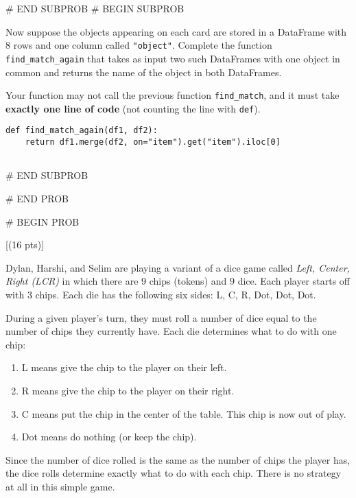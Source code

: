 \documentclass[twoside,12pt]{article}
\begin{document}
{        
    

# END SUBPROB
    # BEGIN SUBPROB


        Now suppose the objects appearing on each card are stored in a DataFrame with 8 rows and one column called \texttt{"object"}. Complete the function \texttt{find\_match\_again} that takes as input two such DataFrames with one object in common and returns the name of the object in both DataFrames. 

        Your function may not call the previous function \texttt{find\_match}, and it must take \textbf{exactly one line of code} (not counting the line with \texttt{def}).

\begin{mdframed}
\begin{verbatim}
def find_match_again(df1, df2):
    return df1.merge(df2, on="item").get("item").iloc[0]
    
\end{verbatim}
\end{mdframed}

    

# END SUBPROB




# END PROB

\newpage
# BEGIN PROB

[(16 pts)]

Dylan, Harshi, and Selim are playing a variant of a dice game called \textit{Left, Center, Right (LCR)} in which there are $9$ chips (tokens) and $9$ dice. Each player starts off with $3$ chips. Each die has the following six sides: L, C, R, Dot, Dot, Dot. 

During a given player's turn, they must roll a number of dice equal to the number of chips they currently have. Each die determines what to do with one chip:
\begin{enumerate}
\item L means give the chip to the player on their left.
\item R means give the chip to the player on their right.
\item C means put the chip in the center of the table. This chip is now out of play.
\item Dot means do nothing (or keep the chip).
\end{enumerate}
Since the number of dice rolled is the same as the number of chips the player has, the dice rolls determine exactly what to do with each chip. There is no strategy at all in this simple game.

}
\end{document}
